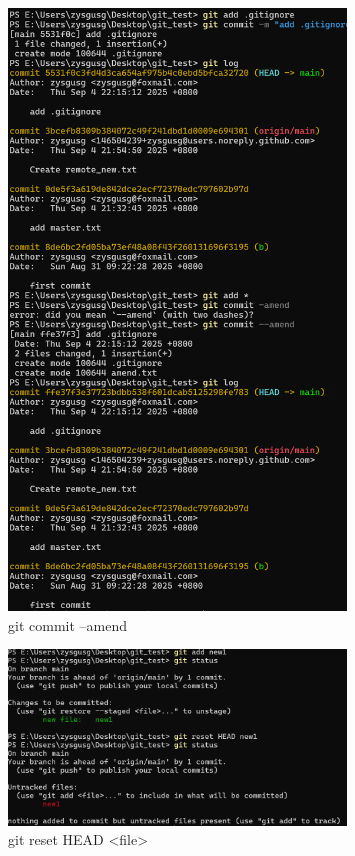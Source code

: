 \documentclass[UTF8]{ctexart}
\begin{document}
\begin{figure}[htbp]
    \centering
    \includegraphics[width=0.8\textwidth]{20.png} 
    \caption{git commit --amend}
\end{figure}
\begin{figure}[htbp]
    \centering
    \includegraphics[width=0.8\textwidth]{21.png} 
    \caption{git reset HEAD <file>}
\end{figure}
\end{document}
